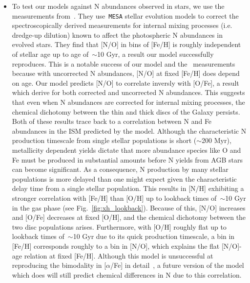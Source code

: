 \documentclass[ms.tex]{subfiles}
\begin{document}
\begin{itemize}
	\item To test our models against N abundances observed in stars, we use the
	measurements from~\citet{Vincenzo2021}.
	They use~\texttt{MESA} stellar evolution models to correct the
	spectroscopically derived measurements for internal mixing processes (i.e.
	dredge-up dilution) known to affect the photospheric N abundances in
	evolved stars.
	They find that [N/O] in bins of [Fe/H] is roughly independent of stellar age
	up to age of~$\sim$10 Gyr, a result our model successfully reproduces.
	This is a notable success of our model and the~\citet{Vincenzo2021}
	measurements because with uncorrected N abundances, [N/O] at fixed [Fe/H]
	does depend on age.
	Our model predicts [N/O] to correlate inversly with [O/Fe], a result which
	\citet{Vincenzo2021} derive for both corrected and uncorrected N abundances.
	This suggests that even when N abundances are corrected for internal mixing
	processes, the chemical dichotomy between the thin and thick discs of the
	Galaxy persists.
	Both of these results trace back to a correlation between N and Fe
	abundances in the ISM predicted by the model.
	Although the characteristic N production timescale from single stellar
	populations is short ($\sim$200 Myr), metallicity dependent yields dictate
	that more abundance species like O and Fe must be produced in substantial
	amounts before N yields from AGB stars can become significant.
	As a consequence, N production by many stellar populations is more
	delayed than one might expect given the characteristic delay time from a
	single stellar population.
	This results in [N/H] exhibiting a stronger correlation with [Fe/H] than
	[O/H] up to lookback times of~$\sim$10 Gyr in the gas phase (see
	Fig.~\ref{fig:xh_lookback}).
	Because of this, [N/O] increases and [O/Fe] decreases at fixed [O/H], and
	the chemical dichotomy between the two disc populations arises.
	Furthermore, with [O/H] roughly flat up to lookback times of~$\sim$10 Gyr
	due to its quick production timescale, a bin in [Fe/H] corresponds roughly
	to a bin in [N/O], which explains the flat [N/O]-age relation at fixed
	[Fe/H].
	Although this model is unsuccessful at reproducing the bimodality in
	[$\alpha$/Fe] in detail~\citep{Johnson2021}, a future version of the model
	which does will still predict chemical differences in N due to this
	correlation.


\end{itemize}
\end{document}
